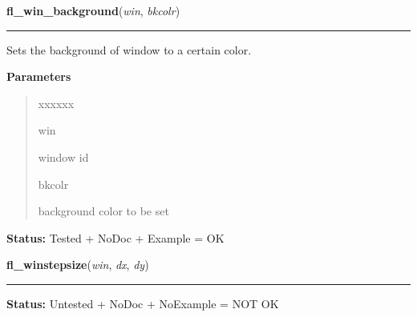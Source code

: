 \hspace{.8\funcindent}\begin{boxedminipage}{\funcwidth}

    \raggedright \textbf{fl\_win\_background}(\textit{win}, \textit{bkcolr})

    \vspace{-1.5ex}

    \rule{\textwidth}{0.5\fboxrule}
\setlength{\parskip}{2ex}
    Sets the background of window to a certain color.

\setlength{\parskip}{1ex}
      \textbf{Parameters}
      \vspace{-1ex}

      \begin{quote}
        \begin{Ventry}{xxxxxx}

          \item[win]

          window id

          \item[bkcolr]

          background color to be set

        \end{Ventry}

      \end{quote}

\textbf{Status:} Tested + NoDoc + Example = OK



    \end{boxedminipage}

    \label{xformslib:library:fl_winstepsize}

    \vspace{0.5ex}

\hspace{.8\funcindent}\begin{boxedminipage}{\funcwidth}

    \raggedright \textbf{fl\_winstepsize}(\textit{win}, \textit{dx}, \textit{dy})

    \vspace{-1.5ex}

    \rule{\textwidth}{0.5\fboxrule}
\setlength{\parskip}{2ex}
\setlength{\parskip}{1ex}
\textbf{Status:} Untested + NoDoc + NoExample = NOT OK



    \end{boxedminipage}

